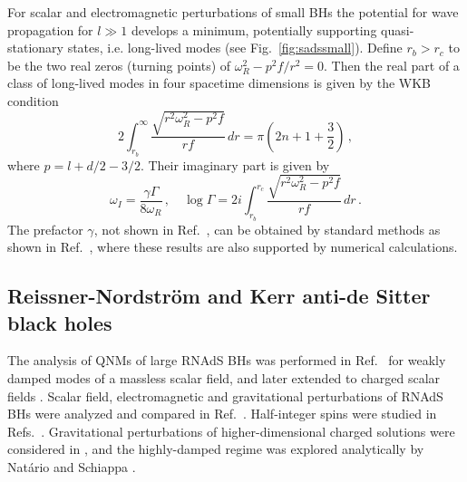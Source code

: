 \documentclass[]{iopart}
\def\be{\begin{equation}}
\def\ee{\end{equation}}
\begin{document}
For scalar and electromagnetic perturbations of small BHs the potential for
wave propagation for $l\gg 1$ develops a minimum, potentially supporting
quasi-stationary states, i.e. long-lived modes (see Fig.~\ref{fig:sadssmall}).
%
Define $r_b>r_c$ to be the two real zeros (turning points) of
$\omega_R^2-p^2f/r^2=0$. Then the real part of a class of long-lived modes in
four spacetime dimensions is given by the WKB condition
%
\be
2\int_{r_b}^{\infty}\frac{\sqrt{r^2\omega_R^2-p^2f}}{rf}\,dr=\pi\left (2n+1+\frac{3}{2}\right)\,,
\ee
%
where $p=l+d/2-3/2$. Their imaginary part is given by
%
\be
\omega_I=\frac{\gamma \Gamma}{8\omega_R}\,,\quad
\log \Gamma=2i\int_{r_b}^{r_c}\frac{\sqrt{r^2\omega_R^2-p^2f}}{rf}\,dr\,.
\ee
%
The prefactor $\gamma$, not shown in Ref.~\cite{Festuccia:2008zx}, can be
obtained by standard methods as shown in Ref.~\cite{Berti:2009wx}, where these
results are also supported by numerical calculations.

\subsection{Reissner-Nordstr\"om and Kerr anti-de Sitter black holes}

The analysis of QNMs of large RNAdS BHs was performed in
Ref.~\cite{Wang:2000gsa,Wang:2000dt} for weakly damped modes of a massless
scalar field, and later extended to charged scalar fields
\cite{Konoplya:2002ky}.  Scalar field, electromagnetic and gravitational
perturbations of RNAdS BHs were analyzed and compared in
Ref.~\cite{Berti:2003ud}. Half-integer spins were studied in
Refs.~\cite{Jing:2005uy,Zhang:2006bc}. Gravitational perturbations of
higher-dimensional charged solutions were considered in
\cite{Konoplya:2008rq}, and the highly-damped regime was explored analytically
by Nat\'ario and Schiappa \cite{Natario:2004jd}.
\end{document}
